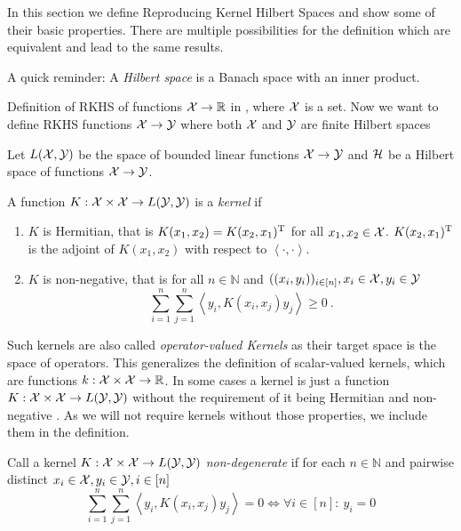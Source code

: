 In this section we define Reproducing Kernel Hilbert Spaces and show some of their basic properties.
There are multiple possibilities for the definition which are equivalent and lead to the same results.

A quick reminder: A \emph{Hilbert space} is a Banach space with an inner product.

Definition of RKHS of functions $\mathcal{X} \rightarrow \mathbb{R}$ in \cite{sejdinovic12}, where $\mathcal{X}$ is a set.
Now we want to define RKHS functions $\mathcal{X} \rightarrow \mathcal{Y}$ where both $\mathcal{X}$ and $\mathcal{Y}$ are finite Hilbert spaces 

Let $L(\mathcal{X}, \mathcal{Y})$ be the space of bounded linear functions $\mathcal{X} \rightarrow \mathcal{Y}$ and $\mathcal{H}$ be a Hilbert space of functions $\mathcal{X} \rightarrow \mathcal{Y}$.

\begin{definition}
	\label{def:kernel}
	A function $K: \mathcal{X} \times \mathcal{X} \rightarrow L(\mathcal{Y}, \mathcal{Y})$ is a \emph{kernel} if
	\begin{enumerate}
		\item $K$ is Hermitian, that is $K(x_1, x_2) = K(x_2, x_1)^{\mathrm{T}}$ for all $x_1, x_2 \in \mathcal{X}$. 
		$K(x_2, x_1)^{\mathrm{T}}$ is the adjoint of $K(x_1, x_2)$ with respect to $\left<\cdot, \cdot\right>$.
		\item $K$ is non-negative, that is for all $n \in \mathbb{N}$ and $((x_i, y_i))_{i \in [n]}, x_i \in \mathcal{X}, y_i \in \mathcal{Y}$
		\begin{equation}
			\sum_{i=1}^n \sum_{j=1}^n \left< y_i, K(x_i, x_j)  y_j\right> \geq 0 \ .
		\end{equation}
	\end{enumerate}
\end{definition}

Such kernels are also called \emph{operator-valued Kernels} as their target space is the space of operators.
This generalizes the definition of scalar-valued kernels, which are functions $k: \mathcal{X} \times \mathcal{X} \rightarrow \mathbb{R}$.
In some cases a kernel is just a function $K: \mathcal{X} \times \mathcal{X} \rightarrow L(\mathcal{Y}, \mathcal{Y})$ without the requirement of it being Hermitian and non-negative \cite{sejdinovic12}.
As we will not require kernels without those properties, we include them in the definition.

\begin{definition}
	Call a kernel $K: \mathcal{X} \times \mathcal{X} \rightarrow L(\mathcal{Y}, \mathcal{Y})$ \emph{non-degenerate} if for each $n \in \mathbb{N}$ and pairwise distinct $x_i \in \mathcal{X}, y_i \in \mathcal{Y}, i \in [n]$
	\begin{equation}
		\sum_{i=1}^n \sum_{j=1}^n \left< y_i, K(x_i, x_j)  y_j\right> = 0 \Leftrightarrow \forall i \in [n]:~ y_i = 0
	\end{equation}
\end{definition}

